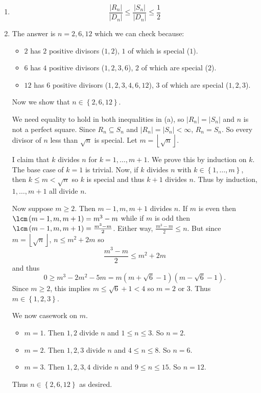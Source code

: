 \begin{enumerate}[label=(\alph*)]
	\item \[\frac{\left|R_n\right|}{\left|D_n\right|}\leq\frac{\left|S_n\right|}{\left|D_n\right|}\leq\frac{1}{2}\]
	\item The answer is $n=\boxed{2,6,12}$ which we can check because:
	\begin{itemize}
		\item $2$ has $2$ positive divisors ($1,2$), $1$ of which is special ($1$).
		\item $6$ has $4$ positive divisors ($1,2,3,6$), $2$ of which are special ($2$).
		\item $12$ has $6$ positive divisors ($1,2,3,4,6,12$), $3$ of which are special ($1,2,3$).
	\end{itemize}
	Now we show that $n\in\left\{2,6,12\right\}$.
	
	We need equality to hold in both inequalities in (a), so $\left|R_n\right|=\left|S_n\right|$ and $n$ is not a perfect square. Since $R_n\subseteq S_n$ and $\left|R_n\right|=\left|S_n\right|<\infty$, $R_n=S_n$. So every divisor of $n$ less than $\sqrt{n}$ is special. Let $m=\left\lfloor\sqrt{n}\right\rfloor$.
	
	I claim that $k$ divides $n$ for $k=1,\ldots,m+1$. We prove this by induction on $k$. The base case of $k=1$ is trivial. Now, if $k$ divides $n$ with $k\in\left\{1,\ldots,m\right\}$, then $k\leq m<\sqrt{n}$ so $k$ is special and thus $k+1$ divides $n$. Thus by induction, $1,\ldots,m+1$ all divide $n$.
	
	Now suppose $m\geq2$. Then $m-1,m,m+1$ divides $n$. If $m$ is even then $\lcm\left(m-1,m,m+1\right)=m^3-m$ while if $m$ is odd then $\lcm\left(m-1,m,m+1\right)=\frac{m^3-m}{2}$. Either way, $\frac{m^3-m}{2}\leq n$. But since $m=\left\lfloor\sqrt{n}\right\rfloor$, $n\leq m^2+2m$ so \[\frac{m^3-m}{2}\leq m^2+2m\] and thus \[0\geq m^3-2m^2-5m=m\left(m+\sqrt{6}-1\right)\left(m-\sqrt{6}-1\right).\] Since $m\geq2$, this implies $m\leq\sqrt{6}+1<4$ so $m=2$ or $3$. Thus $m\in\left\{1,2,3\right\}$.
	
	We now casework on $m$.
	\begin{itemize}
		\item $m=1$. Then $1,2$ divide $n$ and $1\leq n\leq3$. So $n=2$.
		\item $m=2$. Then $1,2,3$ divide $n$ and $4\leq n\leq8$. So $n=6$.
		\item $m=3$. Then $1,2,3,4$ divide $n$ and $9\leq n\leq15$. So $n=12$.
	\end{itemize}
	Thus $n\in\left\{2,6,12\right\}$ as desired.
\end{enumerate}